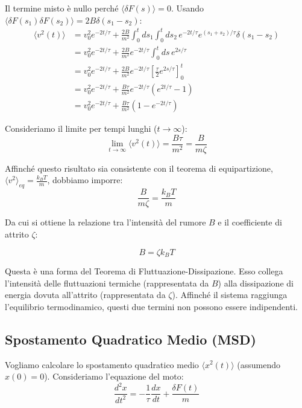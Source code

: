 Il termine misto è nullo perché $\langle \delta F(s) \rangle = 0$.
Usando $\langle \delta F(s_1) \delta F(s_2) \rangle = 2B \delta(s_1-s_2)$:
\begin{equation}
\begin{aligned}
\langle v^2(t) \rangle &= v_0^2 e^{-2t/\tau} + \frac{2B}{m^2} \int_{0}^{t} ds_1 \int_{0}^{t} ds_2 \, e^{-2t/\tau} e^{(s_1+s_2)/\tau} \delta(s_1-s_2) \\
&= v_0^2 e^{-2t/\tau} + \frac{2B}{m^2} e^{-2t/\tau} \int_{0}^{t} ds \, e^{2s/\tau} \\
&= v_0^2 e^{-2t/\tau} + \frac{2B}{m^2} e^{-2t/\tau} \left[ \frac{\tau}{2} e^{2s/\tau} \right]_0^t \\
&= v_0^2 e^{-2t/\tau} + \frac{B\tau}{m^2} e^{-2t/\tau} (e^{2t/\tau} - 1) \\
&= v_0^2 e^{-2t/\tau} + \frac{B\tau}{m^2} (1 - e^{-2t/\tau})
\end{aligned}
\end{equation}

Consideriamo il limite per tempi lunghi ($t \to \infty$):
\begin{equation}
\lim_{t\to\infty} \langle v^2(t) \rangle = \frac{B\tau}{m^2}   = \frac{B}{m \zeta}
\end{equation}

Affinché questo risultato sia consistente con il teorema di equipartizione, $\langle v^2 \rangle_{eq} = \frac{k_B T}{m}$, dobbiamo imporre:
\begin{equation}
\frac{B}{m \zeta} = \frac{k_B T}{m}
\end{equation}

Da cui si ottiene la relazione tra l'intensità del rumore $B$ e il coefficiente di attrito $\zeta$:
\begin{tcolorbox}[colback=colorA!5,colframe=colorA, arc=3mm, boxrule=1.2pt]
\begin{equation}
B =  \zeta k_B T
\end{equation}
\end{tcolorbox}
Questa è una forma del Teorema di Fluttuazione-Dissipazione. Esso collega l'intensità delle fluttuazioni termiche (rappresentata da $B$) alla dissipazione di energia dovuta all'attrito (rappresentata da $\zeta$). Affinché il sistema raggiunga l'equilibrio termodinamico, questi due termini non possono essere indipendenti.

\subsection{Spostamento Quadratico Medio (MSD)}
Vogliamo calcolare lo spostamento quadratico medio $\langle x^2(t) \rangle$ (assumendo $x(0)=0$).  Consideriamo l'equazione del moto:
\begin{equation}
\label{eq:eq_39}
\frac{d^2x}{dt^2}  =- \frac{1}{\tau} \frac{dx}{dt}  + \frac{\delta F(t)}{m}
\end{equation}

